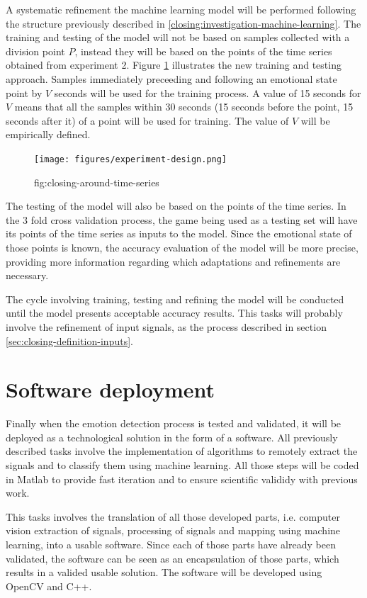 A systematic refinement the machine learning model will be performed following the structure previously described in \ref{closing:investigation-machine-learning}. The training and testing of the model will not be based on samples collected with a division point $P$, instead they will be based on the points of the time series obtained from experiment 2. Figure \ref{fig:closing-around-time-series} illustrates the new training and testing approach. Samples immediately preceeding and following an emotional state point by $V$ seconds will be used for the training process. A value of 15 seconds for $V$ means that all the samples within 30 seconds (15 seconds before the point, 15 seconds after it) of a point will be used for training. The value of $V$ will be empirically defined.

\begin{figure}[ht]
    \centering
    \texttt{[image: figures/experiment-design.png]}
    \caption{fig:closing-around-time-series}
    \label{fig:closing-around-time-series}
\end{figure}

The testing of the model will also be based on the points of the time series. In the 3 fold cross validation process, the game being used as a testing set will have its points of the time series as inputs to the model. Since the emotional state of those points is known, the accuracy evaluation of the model will be more precise, providing more information regarding which adaptations and refinements are necessary.

The cycle involving training, testing and refining the model will be conducted until the model presents acceptable accuracy results. This tasks will probably involve the refinement of input signals, as the process described in section \ref{sec:closing-definition-inputs}.

\section{Software deployment}

Finally when the emotion detection process is tested and validated, it will be deployed as a technological solution in the form of a software. All previously described tasks involve the implementation of algorithms to remotely extract the signals and to classify them using machine learning. All those steps will be coded in Matlab to provide fast iteration and to ensure scientific valididy with previous work.

This tasks involves the translation of all those developed parts, i.e. computer vision extraction of signals, processing of signals and mapping using machine learning, into a usable software. Since each of those parts have already been validated, the software can be seen as an encapsulation of those parts, which results in a valided usable solution. The software will be developed using OpenCV and C++.

